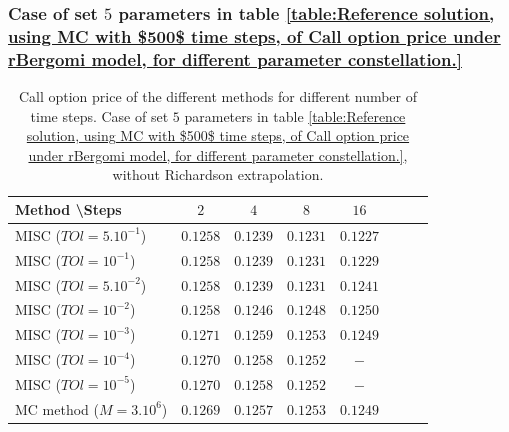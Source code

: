 \documentclass[11pt]{article}
\begin{document}
\subsubsection{Case of set $5$ parameters in table \ref{table:Reference solution, using MC with $500$ time steps, of Call option price under rBergomi model, for different parameter constellation.}}\label{sec:Case of set 5 parameters}

\begin{table}[h!]
	\centering
	\begin{tabular}{l*{6}{c}r}
		Method \textbackslash  Steps            & $2$ & $4$ & $8$ & $16$ &   \\
		\hline
		MISC ($TOl=5.10^{-1}$)  & $0.1258$ & $0.1239$ & $0.1231$ & $0.1227$  \\
		MISC ($TOl=10^{-1}$)  & $0.1258$ & $0.1239$ & $0.1231$ & $0.1229$  \\
		MISC ($TOl=5.10^{-2}$)  & $0.1258$ & $0.1239$ & $0.1231$ & $0.1241$  \\
		MISC ($TOl=10^{-2}$)  & $0.1258$ & $0.1246$ & $0.1248$ & $0.1250$  \\
		MISC ($TOl=10^{-3}$)  & $0.1271$ & $0.1259$ & $0.1253$ & $0.1249$  \\
		MISC ($TOl=10^{-4}$)  & $0.1270$ & $0.1258$ & $0.1252$ & $-$  \\
		
			MISC ($TOl=10^{-5}$)  & $0.1270$ &$0.1258$ &  $0.1252$ & $-$  \\
		\hline
		MC method ($M=3.10^{6}$)   & $    0.1269$ & $0.1257$  & $0.1253$ & $0.1249$ \\		
		
		\hline
	\end{tabular}
	\caption{ Call option price of the different methods for different number of time steps. Case of set $5$ parameters in table \ref{table:Reference solution, using MC with $500$ time steps, of Call option price under rBergomi model, for different parameter constellation.}, without Richardson extrapolation.}
	\label{table: Call option price of the different methods for different number of time steps. Case set 5}
\end{table}
\end{document}
